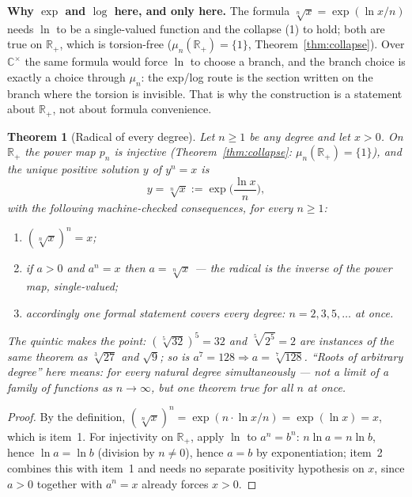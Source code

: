 \documentclass[submission,noinfoline]{jsfds}
\newtheorem{theorem}{Theorem}
\newcommand{\Lean}[1]{}
\begin{document}
\textbf{Why $\exp$ and $\log$ here, and only here.} The formula
$\sqrt[n]{x}=\exp(\ln x/n)$ needs $\ln$ to be a single-valued function
and the collapse (1) to hold; both are true on $\mathbb R_+$, which is
torsion-free ($\mu_n(\mathbb R_+)=\{1\}$, Theorem~\ref{thm:collapse}).
Over $\mathbb C^\times$ the same formula would force $\ln$ to choose a
branch, and the branch choice is exactly a choice through $\mu_n$: the
exp/log route is the section written on the branch where the torsion is
invisible. That is why the construction is a statement about
$\mathbb R_+$, not about formula convenience.

\begin{theorem}[Radical of every degree]\label{thm:anydegree}
Let $n\ge 1$ be any degree and let $x>0$. On $\mathbb R_+$ the power map
$p_n$ is injective (Theorem~\ref{thm:collapse}: $\mu_n(\mathbb R_+)=\{1\}$),
and the unique positive solution $y$ of $y^n=x$ is
\begin{equation}\label{eq:anyroot}
y=\sqrt[n]{x}:=\exp\!\Big(\frac{\ln x}{n}\Big),
\end{equation}
with the following machine-checked consequences, for every $n\ge 1$:
\begin{enumerate}
\item $(\sqrt[n]{x})^n=x$;
\item if $a>0$ and $a^n=x$ then $a=\sqrt[n]{x}$ --- the radical is the
inverse of the power map, single-valued;
\item accordingly one formal statement covers every degree:
$n=2,3,5,\dots$ at once.
\end{enumerate}
The quintic makes the point: $(\sqrt[5]{32})^5=32$ and $\sqrt[5]{2^5}=2$
are instances of the same theorem as $\sqrt[3]{27}$ and $\sqrt{9}$; so is
$a^7=128 \Rightarrow a=\sqrt[7]{128}$. ``Roots of arbitrary degree'' here
means: for every natural degree simultaneously --- not a limit of a family
of functions as $n\to\infty$, but one theorem true for all $n$ at once.
\end{theorem}
\begin{proof}
By the definition, $(\sqrt[n]{x})^n=\exp(n\cdot\ln x/n)=\exp(\ln x)=x$,
which is item~1. For injectivity on $\mathbb R_+$, apply $\ln$ to
$a^n=b^n$: $n\ln a=n\ln b$, hence $\ln a=\ln b$ (division by $n\ne0$),
hence $a=b$ by exponentiation; item~2 combines this with item~1 and needs
no separate positivity hypothesis on $x$, since $a>0$ together with
$a^n=x$ already forces $x>0$.
\Lean{nthrootR\_pow, pow\_inj\_on\_Rpos, nthrootR\_eq\_of\_pow}
\end{proof}
\end{document}
